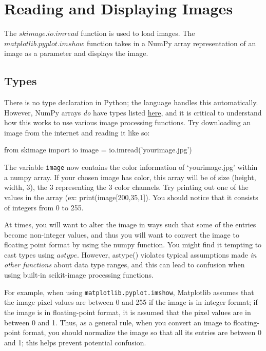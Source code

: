 \documentclass{article}
\begin{document}
\section{Reading and Displaying Images}
The \href{hhttp://scikit-image.org/docs/dev/api/skimage.io.html#skimage.io.imread}{$skimage.io.imread$} function is used to load images.
The \href{https://matplotlib.org/api/_as_gen/matplotlib.pyplot.imshow.html}{$matplotlib.pyplot.imshow$} function takes in a NumPy array representation of an image as a parameter and displays the image.

\subsection{Types}
There is no type declaration in Python; the language handles this automatically. However, NumPy arrays \textit{do} have types listed \href{https://docs.scipy.org/doc/numpy/user/basics.types.html}{here}, and it is critical to understand how this works to use various image processing functions.
Try downloading an image from the internet and reading it like so:
\begin{python}
from skimage import io
image = io.imread('yourimage.jpg')
\end{python}

The variable \texttt{image} now contains the color information of `yourimage.jpg' within a numpy array. If your chosen image has color, this array will be of size (height, width, 3), the 3 representing the 3 color channels. Try printing out one of the values in the array (ex: print(image[200,35,1]). You should notice that it consists of integers from 0 to 255.

At times, you will want to alter the image in ways such that some of the entries become non-integer values, and thus you will want to convert the image to floating point format by using the numpy function. You might find it tempting to cast types using \href{https://docs.scipy.org/doc/numpy-1.15.0/reference/generated/numpy.ndarray.astype.html}{$astype$}. However, astype() violates typical assumptions made \emph{in other functions} about data type ranges, and this can lead to confusion when using built-in scikit-image processing functions.

For example, when using \texttt{matplotlib.pyplot.imshow}, Matplotlib assumes that the image pixel values are between 0 and 255 if the image is in integer format; if the image is in floating-point format, it is assumed that the pixel values are in between 0 and 1. Thus, as a general rule, when you convert an image to floating-point format, you should normalize the image so that all its entries are between 0 and 1; this helps prevent potential confusion.
\end{document}
